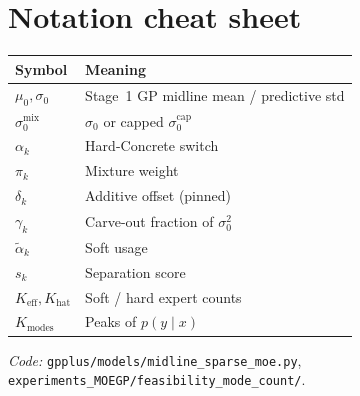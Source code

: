 \documentclass[11pt,a4paper]{article}
\newcommand{\Keff}{K_{\mathrm{eff}}}
\newcommand{\Khat}{K_{\mathrm{hat}}}
\newcommand{\Kmodes}{K_{\mathrm{modes}}}
\begin{document}
\section{Notation cheat sheet}

\begin{center}
\begin{tabular}{@{}ll@{}}
\toprule
Symbol & Meaning \\
\midrule
\(\mu_0,\sigma_0\) & Stage~1 GP midline mean / predictive std \\
\(\sigma_0^{\mathrm{mix}}\) & \(\sigma_0\) or capped \(\sigma_0^{\mathrm{cap}}\) \\
\(\alpha_k\) & Hard-Concrete switch \\
\(\pi_k\) & Mixture weight \\
\(\delta_k\) & Additive offset (pinned) \\
\(\gamma_k\) & Carve-out fraction of \(\sigma_0^2\) \\
\(\tilde\alpha_k\) & Soft usage \\
\(s_k\) & Separation score \\
\(\Keff,\Khat\) & Soft / hard expert counts \\
\(\Kmodes\) & Peaks of \(p(y\mid x)\) \\
\bottomrule
\end{tabular}
\end{center}

\vspace{1em}
\noindent\textit{Code:}
\texttt{gpplus/models/midline\_sparse\_moe.py},
\texttt{experiments\_MOEGP/feasibility\_mode\_count/}.
\end{document}
